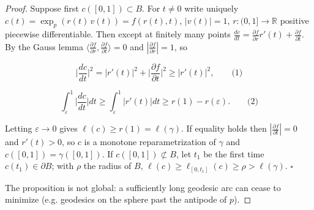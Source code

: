 \begin{proof}
  \leanok
  Suppose first $c([0,1])\subset B$. For $t\ne 0$ write uniquely
  $c(t)=\exp_p(r(t)\,v(t))=f(r(t),t)$, $|v(t)|=1$, $r:(0,1]\to\mathbb{R}$ positive
  piecewise differentiable. Then except at finitely many points
  $\frac{dc}{dt}=\frac{\partial f}{\partial r}r'(t)+\frac{\partial f}{\partial t}$.
  By the Gauss lemma $\langle\frac{\partial f}{\partial r},\frac{\partial f}{\partial t}\rangle=0$
  and $|\frac{\partial f}{\partial r}|=1$, so
  
  $$
  \Big|\frac{dc}{dt}\Big|^2=|r'(t)|^2+\Big|\frac{\partial f}{\partial t}\Big|^2\ge|r'(t)|^2,\qquad\text{(1)}
  $$
  
  $$
  \int_\varepsilon^1\Big|\frac{dc}{dt}\Big|dt\ge\int_\varepsilon^1|r'(t)|dt\ge r(1)-r(\varepsilon).\qquad\text{(2)}
  $$
  
  Letting $\varepsilon\to0$ gives $\ell(c)\ge r(1)=\ell(\gamma)$. If equality holds
  then $|\frac{\partial f}{\partial t}|=0$ and $r'(t)>0$, so $c$ is a monotone
  reparametrization of $\gamma$ and $c([0,1])=\gamma([0,1])$. If $c([0,1])\not\subset B$,
  let $t_1$ be the first time $c(t_1)\in\partial B$; with $\rho$ the radius of $B$,
  $\ell(c)\ge\ell_{[0,t_1]}(c)\ge\rho>\ell(\gamma)$. $\square$
  
  The proposition is not global: a sufficiently long geodesic arc can cease to
  minimize (e.g. geodesics on the sphere past the antipode of $p$).


\end{proof}
